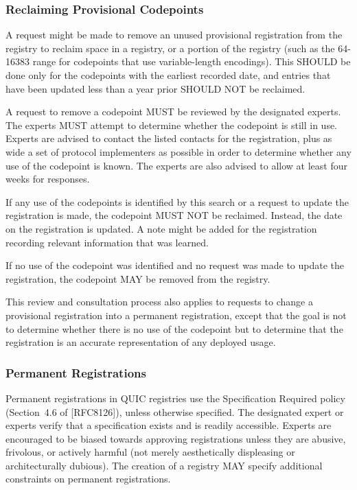 \documentclass{article}
\begin{document}
\subsubsection{Reclaiming Provisional Codepoints}

A request might be made to remove an unused provisional registration from the registry to reclaim space in a registry, or a portion of the registry (such as the 64-16383 range for codepoints that use variable-length encodings).  This SHOULD be done only for the codepoints with the earliest recorded date, and entries that have been updated less than a year prior SHOULD NOT be reclaimed.

A request to remove a codepoint MUST be reviewed by the designated experts.  The experts MUST attempt to determine whether the codepoint is still in use.  Experts are advised to contact the listed contacts for the registration, plus as wide a set of protocol implementers as possible in order to determine whether any use of the codepoint is known.  The experts are also advised to allow at least four weeks for responses.

If any use of the codepoints is identified by this search or a request to update the registration is made, the codepoint MUST NOT be reclaimed.  Instead, the date on the registration is updated.  A note might be added for the registration recording relevant information that was learned.

If no use of the codepoint was identified and no request was made to update the registration, the codepoint MAY be removed from the registry.

This review and consultation process also applies to requests to change a provisional registration into a permanent registration, except that the goal is not to determine whether there is no use of the codepoint but to determine that the registration is an accurate representation of any deployed usage.

\subsubsection{Permanent Registrations}

Permanent registrations in QUIC registries use the Specification Required policy (Section~4.6 of [RFC8126]), unless otherwise specified.  The designated expert or experts verify that a specification exists and is readily accessible.  Experts are encouraged to be biased towards approving registrations unless they are abusive, frivolous, or actively harmful (not merely aesthetically displeasing or architecturally dubious).  The creation of a registry MAY specify additional constraints on permanent registrations.
\end{document}
